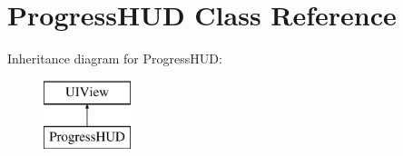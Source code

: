 \hypertarget{interface_progress_h_u_d}{}\section{Progress\+H\+U\+D Class Reference}
\label{interface_progress_h_u_d}
Inheritance diagram for Progress\+H\+U\+D\+:\begin{figure}[H]
\begin{center}
\leavevmode
\includegraphics[height=2.000000cm]{interface_progress_h_u_d}
\end{center}
\end{figure}
